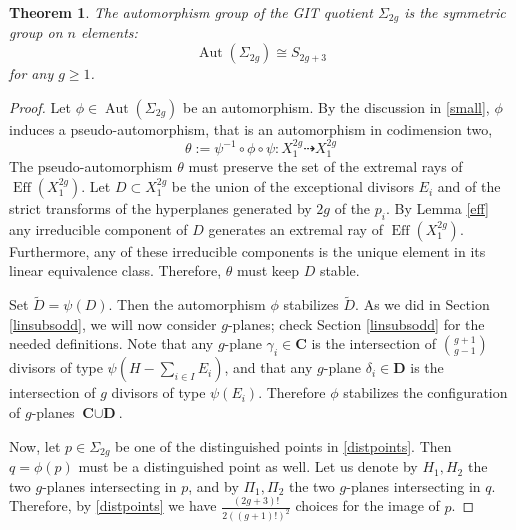 \documentclass[a4paper,10pt]{amsart}
\newtheorem{thm}{Theorem}[section]
\theoremstyle{definition}
\newcommand{\Aut}{\operatorname{Aut}}
\DeclareMathOperator{\Eff}{Eff}
\begin{document}
\begin{thm}\label{thautodd}
The automorphism group of the GIT quotient $\Sigma_{2g}$ is the symmetric group on $n$ elements:
$$\Aut(\Sigma_{2g})\cong S_{2g+3}$$
for any $g\geq 1$.
\end{thm} 
\begin{proof}
Let $\phi\in \Aut(\Sigma_{2g})$ be an automorphism. By the discussion in \ref{small}, $\phi$ induces a pseudo-automorphism, that is an automorphism in codimension two, 
$$\theta:=\psi^{-1}\circ\phi\circ\psi:X_1^{2g}\dasharrow X_1^{2g}$$ 
The pseudo-automorphism $\theta$ must preserve the set of the extremal rays of $\Eff(X_1^{2g})$. Let $D\subset X_1^{2g}$ be the union of the exceptional divisors $E_i$ and of the strict transforms of the hyperplanes generated by $2g$ of the $p_i$. By Lemma \ref{eff} any irreducible component of $D$ generates an extremal ray of $\Eff(X_1^{2g})$. Furthermore, any of these irreducible components is the unique element in its linear equivalence class. Therefore, $\theta$ must keep $D$ stable.

Set $\widetilde{D}=\psi(D)$. Then the automorphism $\phi$ stabilizes $\widetilde{D}$. As we did in Section \ref{linsubsodd}, we will now consider $g$-planes; check Section \ref{linsubsodd} for the needed definitions. Note that any $g$-plane $\gamma_i\in \textbf{C}$ is the intersection of $\binom{g+1}{g-1}$ divisors of type $\psi(H-\sum_{i\in I}E_i)$, and that any $g$-plane $\delta_i\in \textbf{D}$ is the intersection of $g$ divisors of type $\psi(E_i)$. Therefore $\phi$ stabilizes the configuration of $g$-planes $\textbf{C}\cup \textbf{D}$. 

Now, let $p\in \Sigma_{2g}$ be one of the distinguished points in \ref{distpoints}. Then $q = \phi(p)$ must be a distinguished point as well. Let us denote by $H_1,H_2$ the two $g$-planes intersecting in $p$, and by $\Pi_1,\Pi_2$ the two $g$-planes intersecting in $q$. Therefore, by \ref{distpoints} we have $\frac{(2g+3)!}{2((g+1)!)^2}$ choices for the image of $p$.


\end{proof}
\end{document}
